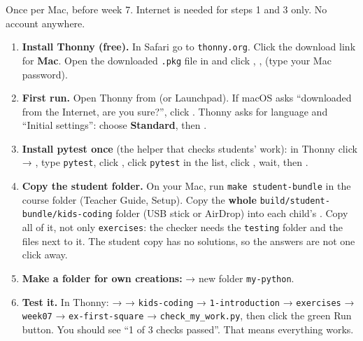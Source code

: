 \begin{teachernote}
Once per Mac, before week 7. Internet is needed for steps 1 and 3 only. No account anywhere.
\begin{enumerate}[leftmargin=1.4em,itemsep=1pt]
  \item \textbf{Install Thonny (free).} In Safari go to \texttt{thonny.org}. Click the download link for \textbf{Mac}. Open the downloaded \texttt{.pkg} file in  and click , ,  (type your Mac password).
  \item \textbf{First run.} Open Thonny from  (or Launchpad). If macOS asks \enquote{downloaded from the Internet, are you sure?}, click . Thonny asks for language and \enquote{Initial settings}: choose \textbf{Standard}, then .
  \item \textbf{Install pytest once} (the helper that checks students' work): in Thonny click  → , type \texttt{pytest}, click , click \texttt{pytest} in the list, click , wait, then .
  \item \textbf{Copy the student folder.} On your Mac, run \texttt{make student-bundle} in the course folder (Teacher Guide, Setup). Copy the \textbf{whole} \texttt{build/student-bundle/kids-coding} folder (USB stick or AirDrop) into each child's . Copy all of it, not only \texttt{exercises}: the checker needs the \texttt{testing} folder and the files next to it. The student copy has no solutions, so the answers are not one click away.
  \item \textbf{Make a folder for own creations:}  → new folder \texttt{my-python}.
  \item \textbf{Test it.} In Thonny:  →  → \texttt{kids-coding} → \texttt{1-introduction} → \texttt{exercises} → \texttt{week07} → \texttt{ex-first-square} → \texttt{check\_my\_work.py}, then click the green Run button. You should see \enquote{1 of 3 checks passed}. That means everything works.
\end{enumerate}
\end{teachernote}

